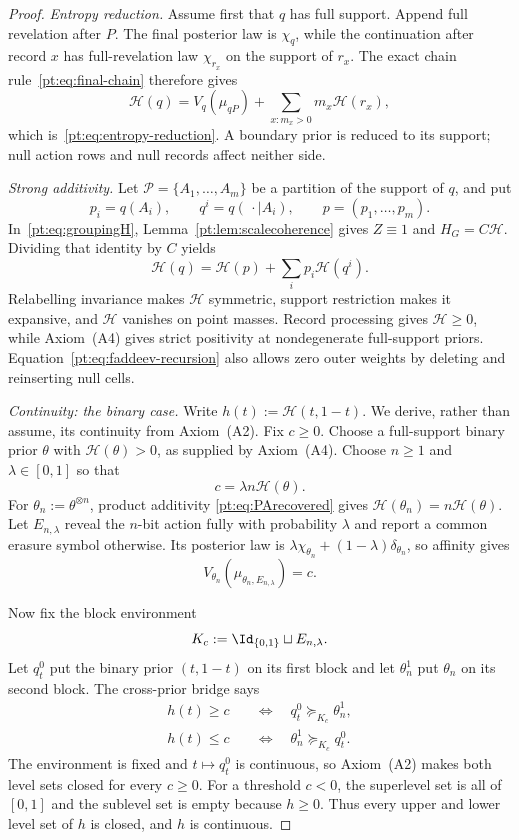 \begin{proof}
\emph{Entropy reduction.}
Assume first that $q$ has full support.  Append full revelation after $P$.
The final posterior law is $\chi_q$, while the continuation after record $x$
has full-revelation law $\chi_{r_x}$ on the support of $r_x$.  The exact
chain rule~\eqref{pt:eq:final-chain} therefore gives
\[
 \mathcal H(q)=V_q(\mu_{qP})
 +\sum_{x:m_x>0}m_x\mathcal H(r_x),
\]
which is~\eqref{pt:eq:entropy-reduction}.  A boundary prior is reduced to its
support; null action rows and null records affect neither side.

\emph{Strong additivity.}
Let $\mathcal P=\{A_1,\ldots,A_m\}$ be a partition of the support of $q$,
and put
\[
 p_i=q(A_i),\qquad q^i=q(\,\cdot\mid A_i),\qquad
 p=(p_1,\ldots,p_m).
\]
In~\eqref{pt:eq:groupingH}, Lemma~\ref{pt:lem:scalecoherence} gives
$Z\equiv1$ and $H_G=C\mathcal H$.  Dividing that identity by $C$ yields
\begin{equation}
 \mathcal H(q)=\mathcal H(p)+\sum_i p_i\mathcal H(q^i).
\tag{FA}\label{pt:eq:faddeev-recursion}
\end{equation}
Relabelling invariance makes $\mathcal H$ symmetric, support restriction makes
it expansive, and $\mathcal H$ vanishes on point masses.  Record processing
gives $\mathcal H\ge0$, while Axiom~\textup{(A4)} gives strict positivity at
nondegenerate full-support priors.  Equation~\eqref{pt:eq:faddeev-recursion}
also allows zero outer weights by deleting and reinserting null cells.

\emph{Continuity: the binary case.}
Write $h(t):=\mathcal H(t,1-t)$.  We derive, rather than assume, its
continuity from Axiom~\textup{(A2)}.  Fix $c\ge0$.  Choose a full-support
binary prior $\theta$ with $\mathcal H(\theta)>0$, as supplied by
Axiom~\textup{(A4)}.  Choose $n\ge1$ and $\lambda\in[0,1]$ so that
\[
 c=\lambda n\mathcal H(\theta).
\]
For $\theta_n:=\theta^{\otimes n}$, product additivity
\eqref{pt:eq:PArecovered} gives
$\mathcal H(\theta_n)=n\mathcal H(\theta)$.  Let $E_{n,\lambda}$ reveal the
$n$-bit action fully with probability $\lambda$ and report a common erasure
symbol otherwise.  Its posterior law is
$\lambda\chi_{\theta_n}+(1-\lambda)\delta_{\theta_n}$, so affinity gives
\[
 V_{\theta_n}(\mu_{\theta_n,E_{n,\lambda}})=c.
\]

Now fix the block environment
\[
 K_c:=\Id_{\{0,1\}}\sqcup E_{n,\lambda}.
\]
Let $q_t^0$ put the binary prior $(t,1-t)$ on its first block and let
$\theta_n^1$ put $\theta_n$ on its second block.  The cross-prior bridge says
\begin{align*}
 h(t)\ge c&\quad\Longleftrightarrow\quad q_t^0\succeq_{K_c}\theta_n^1,\\
 h(t)\le c&\quad\Longleftrightarrow\quad \theta_n^1\succeq_{K_c}q_t^0.
\end{align*}
The environment is fixed and $t\mapsto q_t^0$ is continuous, so
Axiom~\textup{(A2)} makes both level sets closed for every $c\ge0$.  For a
threshold $c<0$, the superlevel set is all of $[0,1]$ and the sublevel set is
empty because $h\ge0$.
Thus every upper and lower level set of $h$ is closed, and $h$ is continuous.


\end{proof}
